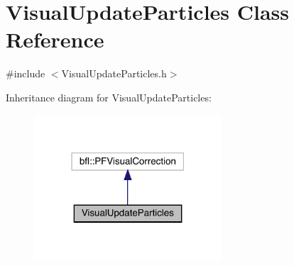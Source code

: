 \hypertarget{classVisualUpdateParticles}{}\section{Visual\+Update\+Particles Class Reference}
\label{classVisualUpdateParticles}


{\ttfamily \#include $<$Visual\+Update\+Particles.\+h$>$}



Inheritance diagram for Visual\+Update\+Particles\+:
\nopagebreak
\begin{figure}[H]
\begin{center}
\leavevmode
\includegraphics[width=198pt]{classVisualUpdateParticles__inherit__graph}
\end{center}
\end{figure}
